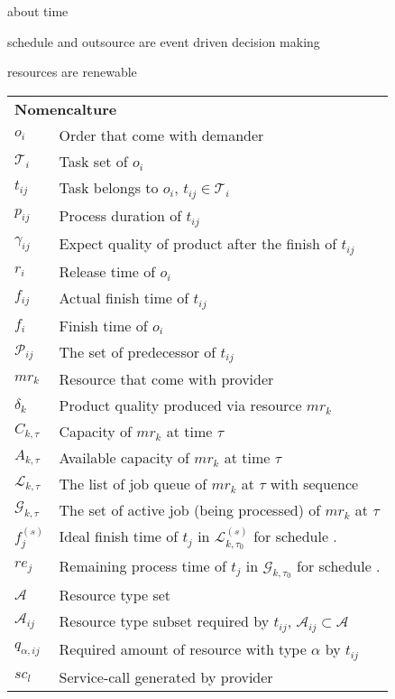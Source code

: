 about time

schedule and outsource are event driven decision making 

resources are renewable

\begin{table}[htbp]
  \scriptsize
\begin{tabularx}{\textwidth}{|lX|}
    \hline
    \multicolumn{2}{|l|}{\multirow{2}[0]{*}{\textbf{Nomencalture}}} \\
    \multicolumn{2}{|l|}{} \\
	$o_i$ & Order that come with demander \\
	$\mathcal{T}_i$ & Task set of $o_i$ \\
	$t_{ij}$ & Task belongs to $o_i$, $t_{ij}\in\mathcal{T}_i$ \\
	$p_{ij}$ & Process duration of $t_{ij}$\\
	$\gamma_{ij}$ & Expect quality of product after the finish of $t_{ij}$\\
	$r_i$ & Release time of $o_i$\\
	$f_{ij}$ & Actual finish time of $t_{ij}$ \\
	$f_{i}$ & Finish time of $o_i$\\
	$\mathcal{P}_{ij}$ & The set of predecessor of $t_{ij}$\\
	$mr_k$ & Resource that come with provider \\
	$\delta_k$ & Product quality produced via resource $mr_k$ \\
	$C_{k,\tau}$ & Capacity of $mr_k$ at time $\tau$\\
	$A_{k,\tau}$ & Available capacity of $mr_k$ at time $\tau$\\
	$\mathcal{L}_{k,\tau}$ & The list of job queue of $mr_k$ at $\tau$ with sequence\\
	$\mathcal{G}_{k,\tau}$ & The set of active job (being processed) of $mr_k$ at $\tau$ \\ 
	$f^{(s)}_j$ & Ideal finish time of $t_j$ in $\mathcal{L}^{(s)}_{k,\tau_0}$ for schedule . \\
	$re_j$ & Remaining process time of $t_j$ in $\mathcal{G}_{k,\tau_0}$ for schedule . \\
	$\mathcal{A}$ & Resource type set \\
	$\mathcal{A}_{ij}$ & Resource type subset required by $t_{ij}$, $\mathcal{A}_{ij}\subset\mathcal{A}$\\
	$q_{\alpha,ij}$ & Required amount of resource with type $\alpha$ by $t_{ij}$\\
	$sc_l$ & Service-call generated by provider\\

\end{tabularx}
\end{table}
